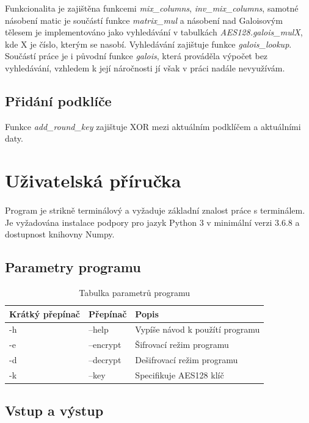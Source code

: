 \documentclass[12pt, a4paper]{article}
\begin{document}
Funkcionalita je zajištěna funkcemi \textit{mix\_columns}, \textit{inv\_mix\_columns}, samotné násobení matic
je součástí funkce \textit{matrix\_mul} a násobení nad Galoisovým tělesem je implementováno jako vyhledávání v tabulkách
\textit{AES128.galois\_mulX}, kde X je číslo, kterým se nasobí. Vyhledávání zajištuje funkce \textit{galois\_lookup}.
Součástí práce je i původní funkce \textit{galois}, která prováděla výpočet bez vyhledávání, vzhledem k její náročnosti
jí však v práci nadále nevyužívám.

\subsection{Přidání podklíče}
Funkce \textit{add\_round\_key} zajištuje XOR mezi aktuálním podklíčem a aktuálními daty.

\newpage{}
\section{Uživatelská příručka}
\paragraph{}
Program je strikně terminálový a vyžaduje základní znalost práce s terminálem. Je vyžadována instalace podpory pro jazyk
Python 3 v minimální verzi 3.6.8 a dostupnost knihovny Numpy.

\subsection{Parametry programu}
\begin{table}[!htbp]
\begin{tabular}{|l|l|l|}
\hline
Krátký přepínač & Přepínač  & Popis                           \\ \hline
-h              & --help    & Vypíše návod k použítí programu \\ \hline
-e              & --encrypt & Šifrovací režim programu        \\ \hline
-d              & --decrypt & Dešifrovací režim programu      \\ \hline
-k              & --key     & Specifikuje AES128 klíč         \\ \hline
\end{tabular}
\caption{Tabulka parametrů programu}
\end{table}

\subsection{Vstup a výstup}
\end{document}
